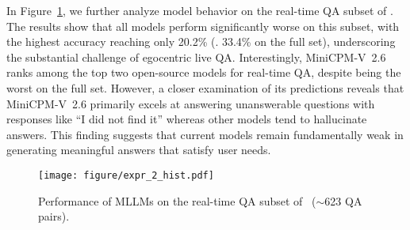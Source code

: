
In Figure~\ref{fig:expr_2_hist}, we further analyze model behavior on the real-time QA subset of \datasetout. The results show that all models perform significantly worse on this subset, with the highest accuracy reaching only 20.2\% (\vs. 33.4\% on the full set), underscoring the substantial challenge of egocentric live QA. Interestingly, MiniCPM-V~2.6~\cite{yao2024minicpm} ranks among the top two open-source models for real-time QA, despite being the worst on the full set. However, a closer examination of its predictions reveals that MiniCPM-V~2.6 primarily excels at answering unanswerable questions with responses like ``I did not find it” whereas other models tend to hallucinate answers. This finding suggests that current models remain fundamentally weak in generating meaningful answers that satisfy user needs.


\begin{figure}[t!]
\centering
\texttt{[image: figure/expr\_2\_hist.pdf]}
\vspace{-0.2cm}
\caption{Performance of MLLMs on the real-time QA subset of \datasetout~($\sim$623 QA pairs).} 
\vspace{-0.4cm}
\label{fig:expr_2_hist}
\end{figure}


